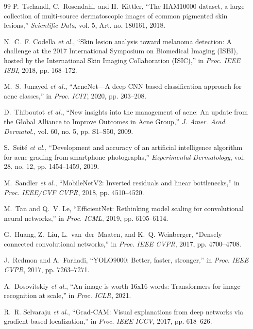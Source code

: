 \documentclass[10pt,conference]{IEEEtran}
\begin{document}
\begin{thebibliography}{99}
P.~Tschandl, C.~Rosendahl, and H.~Kittler, ``The HAM10000 dataset, a large collection of multi-source dermatoscopic images of common pigmented skin lesions,'' \emph{Scientific Data}, vol. 5, Art. no. 180161, 2018.

N.~C.~F. Codella \emph{et al.}, ``Skin lesion analysis toward melanoma detection: A challenge at the 2017 International Symposium on Biomedical Imaging (ISBI), hosted by the International Skin Imaging Collaboration (ISIC),'' in \emph{Proc. IEEE ISBI}, 2018, pp. 168--172.

M.~S. Junayed \emph{et al.}, ``AcneNet---A deep CNN based classification approach for acne classes,'' in \emph{Proc. ICIT}, 2020, pp. 203--208.

D.~Thiboutot \emph{et al.}, ``New insights into the management of acne: An update from the Global Alliance to Improve Outcomes in Acne Group,'' \emph{J. Amer. Acad. Dermatol.}, vol. 60, no. 5, pp. S1--S50, 2009.

S.~Seit{\'e} \emph{et al.}, ``Development and accuracy of an artificial intelligence algorithm for acne grading from smartphone photographs,'' \emph{Experimental Dermatology}, vol. 28, no. 12, pp. 1454--1459, 2019.

M.~Sandler \emph{et al.}, ``MobileNetV2: Inverted residuals and linear bottlenecks,'' in \emph{Proc. IEEE/CVF CVPR}, 2018, pp. 4510--4520.

M.~Tan and Q.~V. Le, ``EfficientNet: Rethinking model scaling for convolutional neural networks,'' in \emph{Proc. ICML}, 2019, pp. 6105--6114.

G.~Huang, Z.~Liu, L.~van~der~Maaten, and K.~Q. Weinberger, ``Densely connected convolutional networks,'' in \emph{Proc. IEEE CVPR}, 2017, pp. 4700--4708.

J.~Redmon and A.~Farhadi, ``YOLO9000: Better, faster, stronger,'' in \emph{Proc. IEEE CVPR}, 2017, pp. 7263--7271.

A.~Dosovitskiy \emph{et al.}, ``An image is worth 16x16 words: Transformers for image recognition at scale,'' in \emph{Proc. ICLR}, 2021.

R.~R. Selvaraju \emph{et al.}, ``Grad-CAM: Visual explanations from deep networks via gradient-based localization,'' in \emph{Proc. IEEE ICCV}, 2017, pp. 618--626.


\end{thebibliography}
\end{document}
